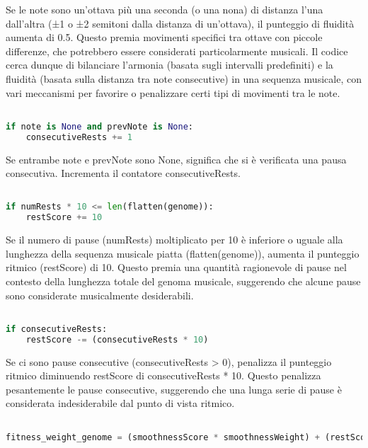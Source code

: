 \documentclass[a4paper,12pt]{report}
\begin{document}
Se le note sono un'ottava più una seconda (o una nona) di distanza l'una dall'altra (±1 o ±2 semitoni dalla distanza di un'ottava), il punteggio di fluidità aumenta di 0.5. 
Questo premia movimenti specifici tra ottave con piccole differenze, che potrebbero essere considerati particolarmente musicali.
Il codice cerca dunque di bilanciare l'armonia (basata sugli intervalli predefiniti) e la fluidità (basata sulla distanza tra note consecutive) in una sequenza musicale, con vari meccanismi per favorire o penalizzare certi tipi di movimenti tra le note.

\begin{lstlisting}[language=Python]

if note is None and prevNote is None:
    consecutiveRests += 1

\end{lstlisting}

Se entrambe note e prevNote sono None, significa che si è verificata una pausa consecutiva. Incrementa il contatore consecutiveRests.

\begin{lstlisting}[language=Python]

if numRests * 10 <= len(flatten(genome)):
    restScore += 10

\end{lstlisting}

Se il numero di pause (numRests) moltiplicato per 10 è inferiore o uguale alla lunghezza della sequenza musicale piatta (flatten(genome)), aumenta il punteggio ritmico (restScore) di 10. 
Questo premia una quantità ragionevole di pause nel contesto della lunghezza totale del genoma musicale, suggerendo che alcune pause sono considerate musicalmente desiderabili.

\begin{lstlisting}[language=Python]

if consecutiveRests:
    restScore -= (consecutiveRests * 10)

\end{lstlisting}

Se ci sono pause consecutive (consecutiveRests > 0), penalizza il punteggio ritmico diminuendo restScore di consecutiveRests * 10. 
Questo penalizza pesantemente le pause consecutive, suggerendo che una lunga serie di pause è considerata indesiderabile dal punto di vista ritmico.

\begin{lstlisting}[language=Python]

fitness_weight_genome = (smoothnessScore * smoothnessWeight) + (restScore * restWeight) + (harmonyScore * harmonyWeight)

\end{lstlisting}
\end{document}
